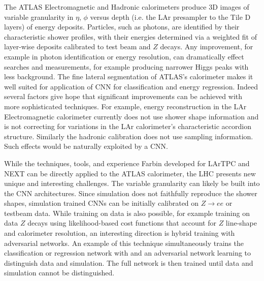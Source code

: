 


The ATLAS Electromagnetic and Hadronic calorimeters produce 3D images
of variable granularity in $\eta$, $\phi$ versus depth (i.e. the LAr
presampler to the Tile D layers) of energy deposits. Particles, such
as photons, are identified by their characteristic shower profiles,
with their energies determined via a weighted fit of layer-wise
deposits calibrated to test beam and $Z$ decays. Any improvement, for
example in photon identification or energy resolution, can
dramatically effect searches and measurements, for example producing
narrower Higgs peaks with less background. The fine lateral
segmentation of ATLAS's calorimeter makes it well suited for
application of CNN for classification and energy regression. Indeed
several factors give hope that significant improvements can be
achieved with more sophisticated techniques. For example, energy
reconstruction in the LAr Electromagnetic calorimeter currently does
not use shower shape information and is not correcting for variations
in the LAr calorimeter's characteristic accordion structure. Similarly
the hadronic calibration does not use sampling information. Such
effects would be naturally exploited by a CNN.

While the techniques, tools, and experience Farbin developed for
LArTPC and NEXT can be directly applied to the ATLAS calorimeter, the
LHC presents new unique and interesting challenges. The variable
granularity can likely be built into the CNN architectures. Since
simulation does not faithfully reproduce the shower shapes, simulation
trained CNNs can be initially calibrated on $Z\rightarrow e e$ or
testbeam data. While training on data is also possible, for example
training on data $Z$ decays using likelihood-based cost functions that
account for $Z$ line-shape and calorimeter resolution, an interesting
direction is hybrid training with adversarial networks. An example of
this technique simultaneously trains the classification or regression
network with and an adversarial network learning to distinguish data
and simulation. The full network is then trained until data and
simulation cannot be distinguished.

